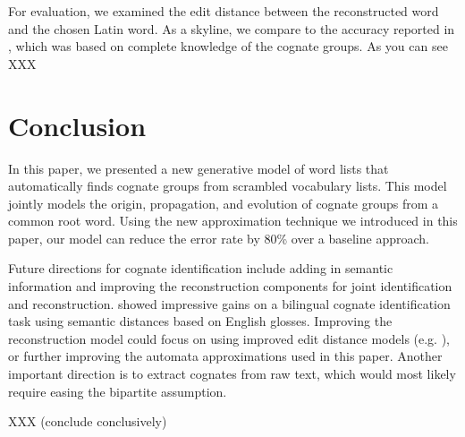 \documentclass[11pt,a4paper]{article}
\begin{document}
For evaluation, we examined the edit distance between the reconstructed
word and the chosen Latin word. As a skyline, we compare to the
accuracy reported in , which was based
on complete knowledge of the cognate groups. As you can see XXX

\section{Conclusion}

In this paper, we presented a new generative model of word lists
that automatically finds cognate groups from scrambled vocabulary
lists. This model jointly models the origin, propagation, and
evolution of cognate groups from a common root word. Using the new
approximation technique we introduced in this paper, our model can
reduce the error rate by 80\% over a baseline approach.

Future directions for cognate identification include adding in
semantic information and improving the reconstruction components
for joint identification and reconstruction. 
showed impressive gains on a bilingual cognate identification task
using semantic distances based on English glosses.  Improving the
reconstruction model could focus on using improved edit distance
models (e.g. ), or further improving
the automata approximations used in this paper. Another important
direction is to extract cognates from raw text, which would most
likely require easing the bipartite assumption.

XXX (conclude conclusively)



\end{document}
